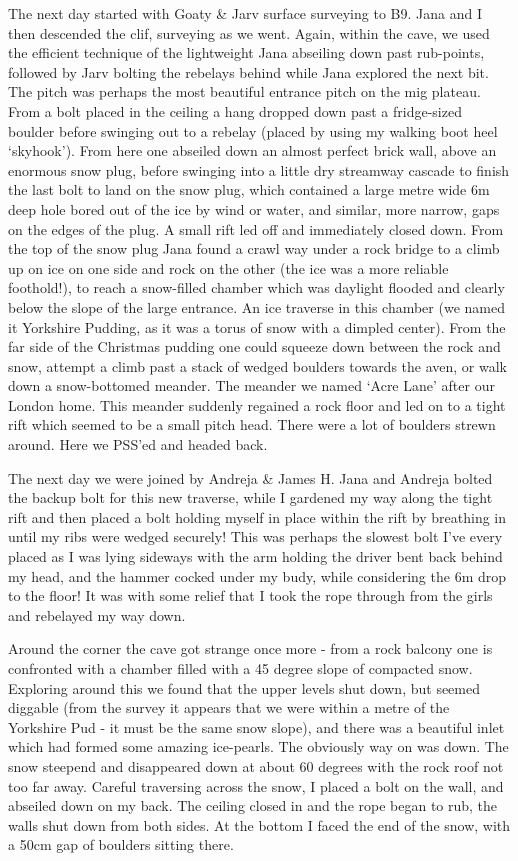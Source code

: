The next day started with Goaty \& Jarv surface surveying to B9. Jana
and I then descended the clif, surveying as we went. Again, within the
cave, we used the efficient technique of the lightweight Jana abseiling
down past rub-points, followed by Jarv bolting the rebelays behind while
Jana explored the next bit. The pitch was perhaps the most beautiful
entrance pitch on the mig plateau. From a bolt placed in the ceiling a
hang dropped down past a fridge-sized boulder before swinging out to a
rebelay (placed by using my walking boot heel `skyhook'). From here one
abseiled down an almost perfect brick wall, above an enormous snow plug,
before swinging into a little dry streamway cascade to finish the last
bolt to land on the snow plug, which contained a large metre wide 6m
deep hole bored out of the ice by wind or water, and similar, more
narrow, gaps on the edges of the plug. A small rift led off and
immediately closed down. From the top of the snow plug Jana found a
crawl way under a rock bridge to a climb up on ice on one side and rock
on the other (the ice was a more reliable foothold!), to reach a
snow-filled chamber which was daylight flooded and clearly below the
slope of the large entrance. An ice traverse in this chamber (we named
it Yorkshire Pudding, as it was a torus of snow with a dimpled center).
From the far side of the Christmas pudding one could squeeze down
between the rock and snow, attempt a climb past a stack of wedged
boulders towards the aven, or walk down a snow-bottomed meander. The
meander we named `Acre Lane' after our London home. This meander
suddenly regained a rock floor and led on to a tight rift which seemed
to be a small pitch head. There were a lot of boulders strewn around.
Here we PSS'ed and headed back.

The next day we were joined by Andreja \& James H. Jana and Andreja
bolted the backup bolt for this new traverse, while I gardened my way
along the tight rift and then placed a bolt holding myself in place
within the rift by breathing in until my ribs were wedged securely! This
was perhaps the slowest bolt I've every placed as I was lying sideways
with the arm holding the driver bent back behind my head, and the hammer
cocked under my budy, while considering the 6m drop to the floor! It was
with some relief that I took the rope through from the girls and
rebelayed my way down.

Around the corner the cave got strange once more - from a rock balcony
one is confronted with a chamber filled with a 45 degree slope of
compacted snow. Exploring around this we found that the upper levels
shut down, but seemed diggable (from the survey it appears that we were
within a metre of the Yorkshire Pud - it must be the same snow slope),
and there was a beautiful inlet which had formed some amazing
ice-pearls. The obviously way on was down. The snow steepend and
disappeared down at about 60 degrees with the rock roof not too far
away. Careful traversing across the snow, I placed a bolt on the wall,
and abseiled down on my back. The ceiling closed in and the rope began
to rub, the walls shut down from both sides. At the bottom I faced the
end of the snow, with a 50cm gap of boulders sitting there.

